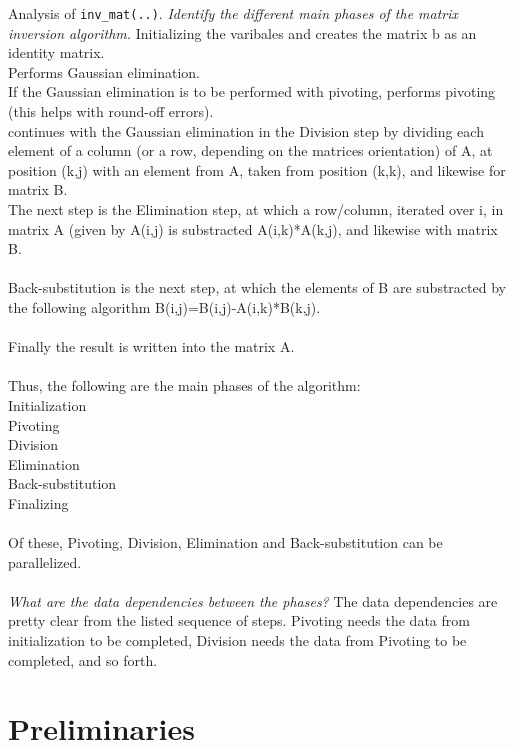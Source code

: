 \documentclass{article}
\begin{document}
\begin{ExerciseList}
  \Exercise Analysis of \verb+inv_mat(..)+.
  \Question \emph{Identify the different main phases of the matrix
    inversion algorithm.}
  \Answer Initializing the varibales and creates the matrix b as an identity matrix.\\
Performs Gaussian elimination.\\
If the Gaussian elimination is to be performed with pivoting, performs pivoting (this helps with round-off errors).\\
continues with the Gaussian elimination in the Division step by dividing each element of a column (or a row, depending on the matrices orientation) of A, at position (k,j) with an element from A, taken from position (k,k), and likewise for matrix B.\\
	The next step is the Elimination step, at which a row/column, iterated over i, in matrix A (given by A(i,j) is substracted A(i,k)*A(k,j), and likewise with matrix B.\\
\\
Back-substitution is the next step, at which the elements of B are substracted by the following algorithm B(i,j)=B(i,j)-A(i,k)*B(k,j).\\
\\
Finally the result is written into the matrix A.\\
\\
Thus, the following are the main phases of the algorithm:\\
Initialization\\
Pivoting\\
Division\\
Elimination\\
Back-substitution\\
Finalizing\\
\\
Of these, Pivoting, Division, Elimination and Back-substitution can be parallelized.\\
\\
  \Question \emph{What are the data dependencies between the phases?}
  \Answer The data dependencies are pretty clear from the listed sequence of steps. Pivoting needs the data from initialization to be completed, Division needs the data from Pivoting to be completed, and so forth. \\

\end{ExerciseList}

\section{Preliminaries}
\end{document}
